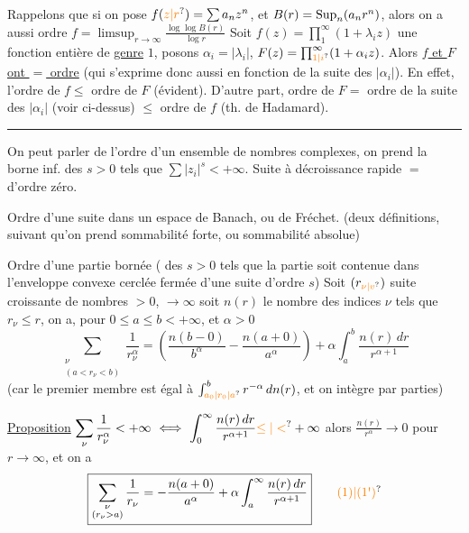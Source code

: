 Rappelons que si on pose $f(\unsure{z|r})=\sum a_n z^n$,
 et $B(r)=\mathop{\rm Sup}_n(a_n r^n)$, alors on
a aussi \qquad ordre  $f=\limsup_{r\to\infty}\frac{\log\log B(r)}{\log r}$
Soit $f(z)=\prod_1^\infty(1+\lambda_iz)$ une fonction entière
de \uline{genre} $1$, posons $\alpha_i=|\lambda_i|$, $F(z)=\prod_{\unsure{1|i}}^\infty(1+\alpha_i z)$.
Alors \uline{$f$ et $F$ ont $=$ ordre} (qui s'exprime donc
aussi en fonction de la suite des $|\alpha_i|$). En effet,
l'ordre de $f\leq$ ordre de $F$ (évident). D'autre
part, ordre de $F=$ ordre de la suite des $|\alpha_i|$
(voir ci-dessus) $\leq$ ordre de $f$ (th. de Hadamard).
\begin{center}\rule{1.5cm}{0.4pt}\end{center}

On peut parler de l'ordre d'un ensemble  de
nombres complexes,  
on prend la borne inf. des $s>0$ tels que
$\sum|z_i|^s<+\infty$. Suite à décroissance rapide $=$
d'ordre zéro.

Ordre d'une suite dans un espace de Banach,
ou de Fréchet. (deux définitions, suivant qu'on
prend sommabilité forte, ou sommabilité absolue)

Ordre d'une partie bornée (  des
$s>0$ tels que la partie soit contenue dans l'enveloppe
convexe cerclée fermée d'une suite d'ordre $s$)
Soit $(r_{\unsure{\nu|v}})$ suite croissante de nombres  $>0$, $\to\infty$
soit $n(r)$ le nombre des indices $\nu$ tels que
$r_\nu\leq r$, on a, pour $0\leq a\leq b<+\infty$, et $\alpha>0$
\[ \boxed{\displaystyle \sum_{\substack{\nu\\(a<r_\nu<b)}}\frac1{r_\nu^\alpha}=\left(\frac{n(b-0)}{b^\alpha}-\frac{n(a+0)}{a^\alpha}\right)+\alpha\int_a^b\frac{n(r)\,dr}{r^{\alpha+1}}}\tag*{(1)} \]
(car le premier membre est égal à $\int_{\unsure{a_0|r_0|a}}^b r^{-\alpha}\,dn(r)$,
et on intègre par parties)

\uline{Proposition} \quad $\displaystyle \sum_\nu\frac1{r_\nu^\alpha}<+\infty\ \Longleftrightarrow\ \int_0^\infty\frac{n(r)\,dr}{r^{\alpha+1}}\unsure{\leq|<}+\infty$
alors $\frac{n(r)}{r^\alpha}\to0$ pour $r\to\infty$, et on a
\[ \boxed{\displaystyle \sum_{\substack{\nu\\(r_\nu>a)}}\frac1{r_\nu}=-\frac{n(a+0)}{a^\alpha}+\alpha\int_a^\infty\frac{n(r)\,dr}{r^{\alpha+1}}}\tag*{\unsure{(1)|(1\textquotesingle)}} \]

